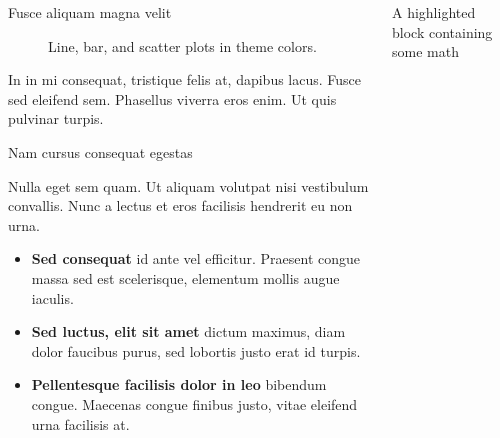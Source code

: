 \begin{columns}[t]
\begin{column}{\colwidth}
\begin{block}{Fusce aliquam magna velit}
\begin{figure}
      \caption{Line, bar, and scatter plots in theme colors.}
    \end{figure}

    In in mi consequat, tristique felis at, dapibus lacus. Fusce sed eleifend
    sem. Phasellus viverra eros enim. Ut quis pulvinar turpis.

  \end{block}

  \begin{block}{Nam cursus consequat egestas}

    Nulla eget sem quam. Ut aliquam volutpat nisi vestibulum convallis. Nunc a
    lectus et eros facilisis hendrerit eu non urna.

    \begin{itemize}
      \item \textbf{Sed consequat} id ante vel efficitur. Praesent congue massa
        sed est scelerisque, elementum mollis augue iaculis.
      \item \textbf{Sed luctus, elit sit amet} dictum maximus, diam dolor
        faucibus purus, sed lobortis justo erat id turpis.
      \item \textbf{Pellentesque facilisis dolor in leo} bibendum congue.
        Maecenas congue finibus justo, vitae eleifend urna facilisis at.
    \end{itemize}

  \end{block}

\end{column}

\separatorcolumn

\begin{column}{\colwidth}

  \begin{exampleblock}{A highlighted block containing some math}


\end{exampleblock}
\end{column}
\end{columns}
